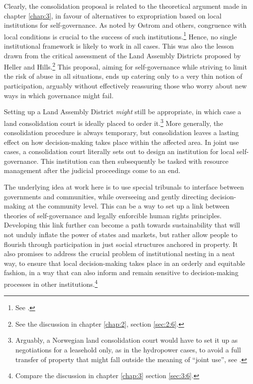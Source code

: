 Clearly, the consolidation proposal is related to the theoretical argument made in chapter \ref{chap:3}, in favour of alternatives to expropriation based on local institutions for self-governance. As noted by Ostrom and others, congruence with local conditions is crucial to the success of such institutions.\footnote{See \cite[92]{ostrom90}.} Hence, no single institutional framework is likely to work in all cases. This was also the lesson drawn from the critical assessment of the Land Assembly Districts proposed by Heller and Hills.\footnote{See the discussion in chapter \ref{chap:2}, section \ref{sec:2:6}.} This proposal, aiming for self-governance while striving to limit the risk of abuse in all situations, ends up catering only to a very thin notion of participation, arguably without effectively reassuring those who worry about new ways in which governance might fail.

Setting up a Land Assembly District {\it might} still be appropriate, in which case a land consolidation court is ideally placed to order it.\footnote{Arguably, a Norwegian land consolidation court would have to set it up as negotiations for a leasehold only, as in the hydropower cases, to avoid a full transfer of property that might fall outside the meaning of ``joint use'', see \cite{holen95}.} More generally, the consolidation procedure is always temporary, but consolidation leaves a lasting effect on how decision-making takes place within the affected area. In joint use cases, a consolidation court literally sets out to design an institution for local self-governance. This institution can then subsequently be tasked with resource management after the judicial proceedings come to an end.

The underlying idea at work here is to use special tribunals to interface between governments and communities, while overseeing and gently directing decision-making at the community level. This can be a way to set up a link between theories of self-governance and legally enforcible human rights principles. Developing this link further can become a path towards sustainability that will not unduly inflate the power of states and markets, but rather allow people to flourish through participation in just social structures anchored in property. It also promises to address the crucial problem of institutional nesting in a neat way, to ensure that local decision-making takes place in an orderly and equitable fashion, in a way that can also inform and remain sensitive to decision-making processes in other institutions.\footnote{Compare the discussion in chapter \ref{chap:3} section \ref{sec:3:6}.}

